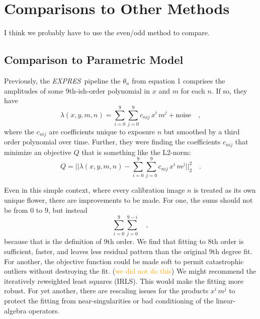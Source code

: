\documentclass[12pt, letterpaper]{article}
\newcommand{\lz}[1]{\textcolor{orange}{#1}}
\newcommand{\project}[1]{\textsl{#1}}
\newcommand{\acronym}[1]{{\small{#1}}}
\newcommand{\expres}{\project{\acronym{EXPRES}}}
\begin{document}

\section{Comparisons to Other Methods} \label{sec:comparisons}
I think we probably have to use the even/odd method to compare.

\subsection{Comparison to Parametric Model}
Previously, the \expres\ pipeline the $\theta_{n}$ from equation 1 comprises the
amplitudes of some 9th-ish-order polynomial in $x$ and $m$ for each $n$.
If so, they have
\begin{equation}
\lambda(x,y,m,n) = \sum_{i=0}^9\sum_{j=0}^9 c_{nij}\, x^i\,m^j + \mathrm{noise}
\quad ,
\end{equation}
where the $c_{nij}$ are coefficients unique to exposure $n$ but smoothed by a third order polynomial over time.
Further, they were finding the coefficients $c_{nij}$ that
minimize an objective $Q$ that is something like the L2-norm:
\begin{equation}
Q = ||\lambda(x,y,m,n) - \sum_{i=0}^9\sum_{j=0}^9 c_{nij}\, x^i\,m^j||_2^2
\quad .
\end{equation}

Even in this simple context, where every calibration image $n$ is
treated as its own unique flower, there are improvements to be
made.
For one, the sums should not be from 0 to 9, but instead
\begin{equation}
\sum_{i=0}^9\sum_{j=0}^{9-i}
\quad ,
\end{equation}
because that is the definition of 9th order.  We find that fitting to 8th order is sufficient, faster, and leaves less residual pattern than the original 9th degree fit.
For another, the objective function could be made soft to permit
catastrophic outliers without destroying the fit. (\lz{we did not do this})
We might recommend the iteratively reweighted least squares (IRLS).
This would make the fitting more robust.
For yet another, there are rescaling issues for the products $x^i\,m^j$ to
protect the fitting from near-singularities or bad conditioning of the
linear-algebra operators.
\end{document}
